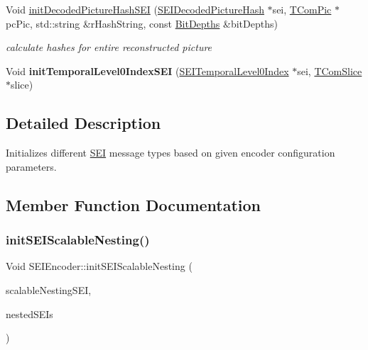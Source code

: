 \begin{DoxyCompactItemize}
Void \hyperlink{class_s_e_i_encoder_a76ec3fabc1aa59a47c57cffbb2957010}{init\+Decoded\+Picture\+Hash\+S\+EI} (\hyperlink{class_s_e_i_decoded_picture_hash}{S\+E\+I\+Decoded\+Picture\+Hash} $\ast$sei, \hyperlink{class_t_com_pic}{T\+Com\+Pic} $\ast$pc\+Pic, std\+::string \&r\+Hash\+String, const \hyperlink{struct_bit_depths}{Bit\+Depths} \&bit\+Depths)
\begin{DoxyCompactList}\small\item\em calculate hashes for entire reconstructed picture \end{DoxyCompactList}\item 
\mbox{\label{class_s_e_i_encoder_afa8dac23aa670aa2a9903c9075231e8a}} 
Void {\bfseries init\+Temporal\+Level0\+Index\+S\+EI} (\hyperlink{class_s_e_i_temporal_level0_index}{S\+E\+I\+Temporal\+Level0\+Index} $\ast$sei, \hyperlink{class_t_com_slice}{T\+Com\+Slice} $\ast$slice)
\end{DoxyCompactItemize}



\subsection{Detailed Description}
Initializes different \hyperlink{class_s_e_i}{S\+EI} message types based on given encoder configuration parameters. 

\subsection{Member Function Documentation}
\mbox{\label{class_s_e_i_encoder_a1ea62701c0f010e2018c00a20d1357d1}} 
\subsubsection{\texorpdfstring{init\+S\+E\+I\+Scalable\+Nesting()}{initSEIScalableNesting()}}
{\footnotesize\ttfamily Void S\+E\+I\+Encoder\+::init\+S\+E\+I\+Scalable\+Nesting (\begin{DoxyParamCaption}\item[{\hyperlink{class_s_e_i_scalable_nesting}{S\+E\+I\+Scalable\+Nesting} $\ast$}]{scalable\+Nesting\+S\+EI,  }\item[{S\+E\+I\+Messages \&}]{nested\+S\+E\+Is }\end{DoxyParamCaption})}

